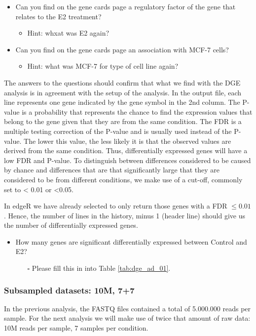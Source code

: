 \begin{itemize}
	\item Can you find on the gene cards page a regulatory factor of the gene that relates
to the E2 treatment?
	\begin{itemize}
		\item Hint: whxat was E2 again?
	\end{itemize}
	\item Can you find on the gene cards page an association with MCF-7 cells?
	\begin{itemize}
		\item Hint: what was MCF-7 for type of cell line again?
	\end{itemize}
\end{itemize}
The answers to the questions should confirm that what we find with the DGE analysis is in agreement with the setup of the analysis. In the output file, each line represents one gene indicated by the gene symbol in the 2nd column. The P-value is a probability that represents the chance to find the expression values that belong to the gene given that
they are from the same condition. The FDR is a multiple testing correction of the P-value and is usually used instead of the P-value. The lower this value, the less likely it is that the observed values are derived from the same condition. Thus, differentially expressed genes will have a low FDR and P-value. To distinguish between differences
considered to be caused by chance and differences that are that significantly large that they are considered to be from different conditions, we make use of a cut-off, commonly set to < 0.01 or <0.05.

In edgeR we have already selected to only return those genes with a FDR $\leq 0.01$. Hence, the number of lines in the history, minus 1 (header line) should give us the number of differentially expressed genes.
\begin{itemize}
	\item How many genes are significant differentially expressed between Control and E2? 
	\begin{itemize}
		\item[$\square$] Please fill this in into Table \ref{tab:dge_ad_01}.
	\end{itemize}
\end{itemize}

\subsubsection{Subsampled datasets: 10M, 7+7}
In the previous analysis, the FASTQ files contained a total of 5.000.000 reads per sample. For the next analysis we will make use of twice that amount of raw data: 10M reads per sample, 7 samples per condition.

